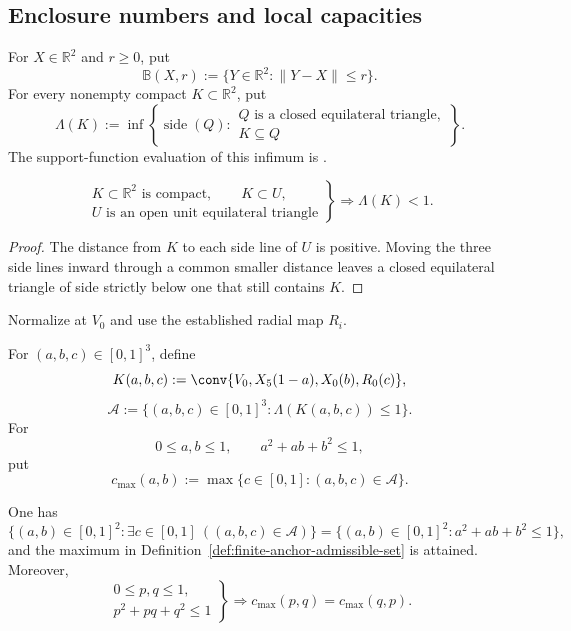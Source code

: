 \subsection{Enclosure numbers and local capacities}

\begin{definition}
\label{def:finite-enclosure-number}
For $X\in\mathbb R^2$ and $r\ge0$, put
\[
 \mathbb B(X,r):=\{Y\in\mathbb R^2:\lVert Y-X\rVert\le r\}.
\]
For every nonempty compact $K\subset\mathbb R^2$, put
\[
 \Lambda(K):=
 \inf\left\{\operatorname{side}(Q):
 \begin{array}{l}
 Q\text{ is a closed equilateral triangle},\\
 K\subseteq Q
 \end{array}
 \right\}.
\]
The support-function evaluation of this infimum is
.
\end{definition}

\begin{lemma}
\label{lem:new-compact-open-shrink}
\[
 \left.
 \begin{gathered}
 K\subset\mathbb R^2\text{ is compact},\qquad K\subset U,\\
 U\text{ is an open unit equilateral triangle}
 \end{gathered}
 \right\}
 \Longrightarrow \Lambda(K)<1.
\]
\end{lemma}

\begin{proof}
The distance from $K$ to each side line of $U$ is positive.  Moving the three
side lines inward through a common smaller distance leaves a closed
equilateral triangle of side strictly below one that still contains $K$.
\end{proof}

Normalize at $V_0$ and use the established radial map $R_i$.

\begin{definition}
\label{def:finite-anchor-admissible-set}
For $(a,b,c)\in[0,1]^3$, define
\[
 K(a,b,c):=\conv\{V_0,X_5(1-a),X_0(b),R_0(c)\},
\]
\[
 \mathcal A:=\{(a,b,c)\in[0,1]^3:\Lambda(K(a,b,c))\le1\}.
\]
For
\[
 0\le a,b\le1,
 \qquad a^2+ab+b^2\le1,
\]
put
\[
 c_{\max}(a,b):=\max\{c\in[0,1]:(a,b,c)\in\mathcal A\}.
\]
\end{definition}

\begin{proposition}
\label{prop:finite-anchor-capacity-interface}
One has
\[
 \{(a,b)\in[0,1]^2:\exists c\in[0,1]\ ((a,b,c)\in\mathcal A)\}
 =\{(a,b)\in[0,1]^2:a^2+ab+b^2\le1\},
\]
and the maximum in Definition~\ref{def:finite-anchor-admissible-set} is
attained.  Moreover,
\[
 \left.
 \begin{gathered}
 0\le p,q\le1,\\
 p^2+pq+q^2\le1
 \end{gathered}
 \right\}
 \Longrightarrow c_{\max}(p,q)=c_{\max}(q,p).
\]
\end{proposition}

